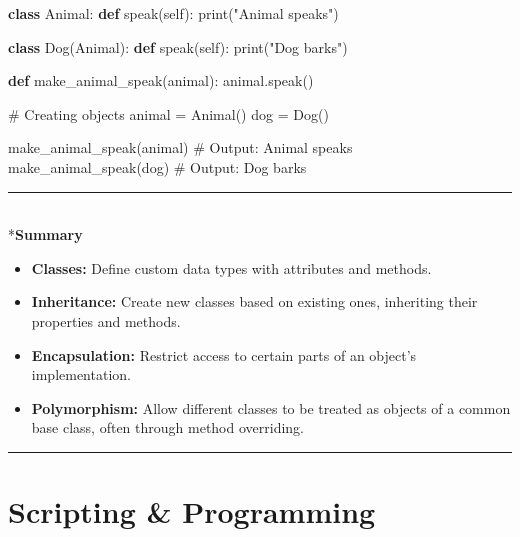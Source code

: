 \documentclass[
  letterpaper,
  DIV=11,
  numbers=noendperiod]{scrreprt}
\makeatletter
\let\oldsubparagraph\subparagraph
\renewcommand{\subparagraph}{
    \@ifstar
      \xxxSubParagraphStar
      \xxxSubParagraphNoStar
  }
\newcommand{\xxxSubParagraphStar}[1]{\oldsubparagraph*{#1}\mbox{}}
\newcommand{\xxxSubParagraphNoStar}[1]{\oldsubparagraph{#1}\mbox{}}
\newenvironment{Shaded}{\begin{snugshade}}{\end{snugshade}}
\newcommand{\BuiltInTok}[1]{\textcolor[rgb]{0.00,0.23,0.31}{#1}}
\newcommand{\CommentTok}[1]{\textcolor[rgb]{0.37,0.37,0.37}{#1}}
\newcommand{\KeywordTok}[1]{\textcolor[rgb]{0.00,0.23,0.31}{\textbf{#1}}}
\newcommand{\NormalTok}[1]{\textcolor[rgb]{0.00,0.23,0.31}{#1}}
\newcommand{\OperatorTok}[1]{\textcolor[rgb]{0.37,0.37,0.37}{#1}}
\newcommand{\StringTok}[1]{\textcolor[rgb]{0.13,0.47,0.30}{#1}}
\newcommand{\VariableTok}[1]{\textcolor[rgb]{0.07,0.07,0.07}{#1}}
\providecommand{\tightlist}{%
  \setlength{\itemsep}{0pt}\setlength{\parskip}{0pt}}
\makeatother
\begin{document}
\begin{Shaded}
\begin{Highlighting}[]
\KeywordTok{class}\NormalTok{ Animal:}
    \KeywordTok{def}\NormalTok{ speak(}\VariableTok{self}\NormalTok{):}
        \BuiltInTok{print}\NormalTok{(}\StringTok{"Animal speaks"}\NormalTok{)}

\KeywordTok{class}\NormalTok{ Dog(Animal):}
    \KeywordTok{def}\NormalTok{ speak(}\VariableTok{self}\NormalTok{):}
        \BuiltInTok{print}\NormalTok{(}\StringTok{"Dog barks"}\NormalTok{)}

\KeywordTok{def}\NormalTok{ make\_animal\_speak(animal):}
\NormalTok{    animal.speak()}

\CommentTok{\# Creating objects}
\NormalTok{animal }\OperatorTok{=}\NormalTok{ Animal()}
\NormalTok{dog }\OperatorTok{=}\NormalTok{ Dog()}

\NormalTok{make\_animal\_speak(animal)  }\CommentTok{\# Output: Animal speaks}
\NormalTok{make\_animal\_speak(dog)     }\CommentTok{\# Output: Dog barks}
\end{Highlighting}
\end{Shaded}

\begin{center}\rule{0.5\linewidth}{0.5pt}\end{center}

\subparagraph*{\texorpdfstring{\textbf{Summary}}{Summary}}\label{summary-2}

\begin{itemize}
\tightlist
\item
  \textbf{Classes:} Define custom data types with attributes and
  methods.
\item
  \textbf{Inheritance:} Create new classes based on existing ones,
  inheriting their properties and methods.
\item
  \textbf{Encapsulation:} Restrict access to certain parts of an
  object's implementation.
\item
  \textbf{Polymorphism:} Allow different classes to be treated as
  objects of a common base class, often through method overriding.
\end{itemize}

\begin{center}\rule{0.5\linewidth}{0.5pt}\end{center}


\chapter*{Scripting \& Programming}\label{scripting-programming}
\end{document}
